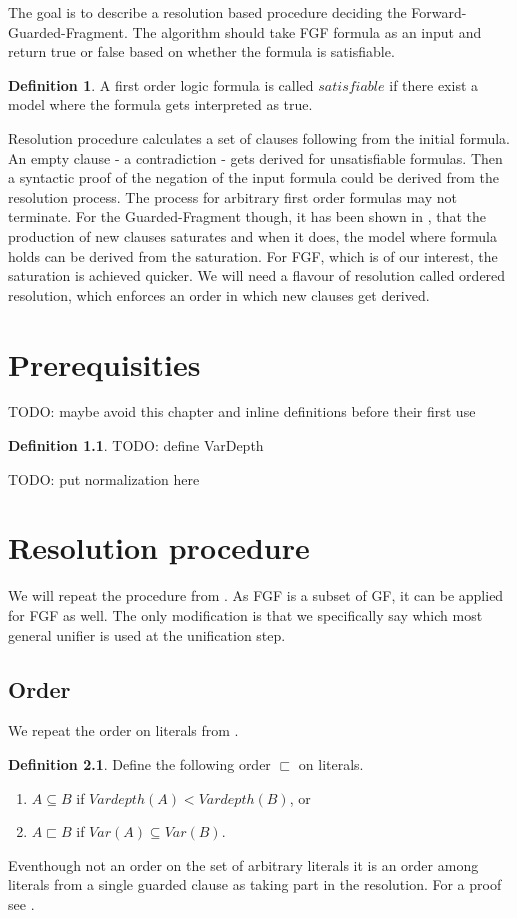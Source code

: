 \documentclass[english, shortabstract]{iithesis}
\theoremstyle{definition} \newtheorem{definition}{Definition}[chapter]
\theoremstyle{remark} \newtheorem{remark}[definition]{Observation}
\theoremstyle{plain} \newtheorem{theorem}[definition]{Theorem}
\theoremstyle{plain} \newtheorem{lemma}[definition]{Lemma}
\begin{document}
The goal is to describe a resolution based procedure deciding the Forward-Guarded-Fragment.
The algorithm should take FGF formula as an input and return true or false based on whether the formula is satisfiable.

\begin{definition}
A first order logic formula is called $satisfiable$ if there exist a model where the formula gets interpreted as true.
\end{definition}

Resolution procedure calculates a set of clauses following from the initial formula.
An empty clause - a contradiction - gets derived for unsatisfiable formulas. 
Then a syntactic proof of the negation of the input formula could be derived from the resolution process.
The process for arbitrary first order formulas may not terminate.
For the Guarded-Fragment though, it has been shown in \cite{resolution GF}, that the production of new clauses saturates
and when it does, the model where formula holds can be derived from the saturation.
For FGF, which is of our interest, the saturation is achieved quicker.
We will need a flavour of resolution called ordered resolution, which enforces an order in which new clauses get derived.

\chapter{Prerequisities}
TODO: maybe avoid this chapter and inline definitions before their first use
\begin{definition}
    TODO: define VarDepth
\end{definition}

TODO: put normalization here

\chapter{Resolution procedure}

We will repeat the procedure from \cite{resolution gf}. As FGF is a subset of GF, it can be applied for FGF as well.
The only modification is that we specifically say which most general unifier is used at the unification step.

\section{Order}
We repeat the order on literals from \cite{resolution gf}.
\begin{definition}
Define the following order $\sqsubset$ on literals.
\begin{enumerate}
    \item $A \subseteq B$ if $Vardepth(A) < Vardepth(B)$, or
    \item $A \sqsubset B$ if $Var(A) \subseteq Var(B)$.
\end{enumerate}
\end{definition}
Eventhough not an order on the set of arbitrary literals it is an order among literals from a single guarded clause as taking part in the resolution.
For a proof see \cite{resolution gf}.
\end{document}
